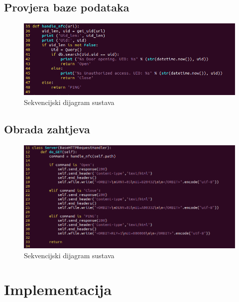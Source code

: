 \documentclass[times, utf8, zavrsni]{fer}
\begin{document}
\subsection{Provjera baze podataka}

\begin{figure}[h]
\includegraphics[scale=0.5]{baza.png}
\centering
\caption{Sekvencijski dijagram sustava}
\centering
\end{figure}

\subsection{Obrada zahtjeva	}

\begin{figure}[h]
\includegraphics[scale=0.5]{server.png}
\centering
\caption{Sekvencijski dijagram sustava}
\centering
\end{figure}

\section{Implementacija}
\end{document}
